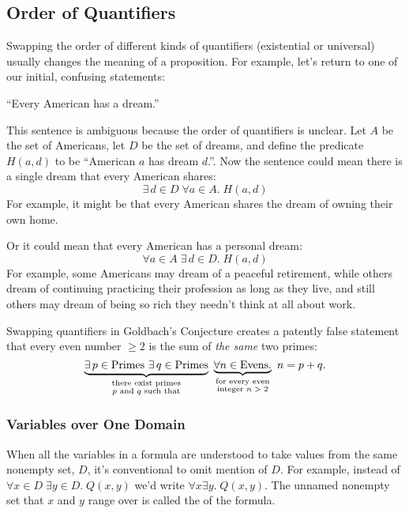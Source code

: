 \subsection{Order of Quantifiers}

Swapping the order of different kinds of quantifiers (existential or
universal) usually changes the meaning of a proposition.  For example, let's return to one of our initial, confusing statements:
\begin{center}
``Every American has a dream.''
\end{center}

This sentence is ambiguous because the order of quantifiers is
unclear.  Let $A$ be the set of Americans, let $D$ be the set of
dreams, and define the predicate $H(a, d)$ to be ``American $a$ has
dream $d$.''.  Now the sentence could mean there is a single dream
that every American shares:
\[
\exists\, d \in D\; \forall a \in A.\; H(a, d)
\]
For example, it might be that every American shares the dream of owning
their own home.

Or it could mean that every American has a personal dream:
\[
\forall a \in A\; \exists\, d \in D.\; H(a, d)
\]
For example, some Americans may dream of a peaceful retirement, while
others dream of continuing practicing their profession as long as they
live, and still others may dream of being so rich they needn't think at
all about work.

Swapping quantifiers in Goldbach's Conjecture creates a patently false
statement that every even number $\geq 2$ is the sum of \emph{the same}
two primes:
\[
\underbrace{\exists\, p \in \text{Primes}\ \exists\, q \in \text{Primes}}_{\substack
    {\text{there exist primes} \\
     \text{$p$ and $q$ such that}}}
\
\underbrace{\forall n \in \text{Evens}.}_{\substack
    {\text{for every even} \\
     \text{integer $n > 2$}}}
\ n = p + q.
\]

\subsubsection{Variables over One Domain}
When all the variables in a formula are understood to take values from the
same nonempty set, $D$, it's conventional to omit mention of $D$.  For
example, instead of $\forall x \in D\; \exists y \in D.\; Q(x,y)$ we'd write
$\forall x \exists y.\; Q(x,y)$.  The unnamed nonempty set that $x$ and
$y$ range over is called the \term{domain} of the formula.


